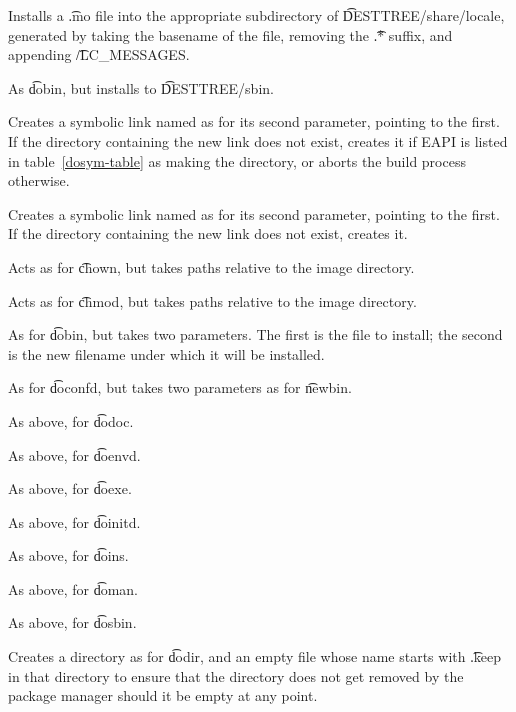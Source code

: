 \begin{description}
\item[domo] Installs a \t{.mo} file into the appropriate subdirectory of \t{DESTTREE/share/locale},
    generated by taking the basename of the file, removing the \t{.*} suffix, and appending
    \t{/LC\_MESSAGES}.

\item[dosbin] As \t{dobin}, but installs to \t{DESTTREE/sbin}.

\IFKDEBUILDELSE
{
    \item[dosym] Creates a symbolic link named as for its second parameter, pointing to the first. If
        the directory containing the new link does not exist, creates it if EAPI is listed in
        table~\ref{dosym-table} as making the directory, or aborts the build process otherwise.
}{
    \item[dosym] Creates a symbolic link named as for its second parameter, pointing to the first. If
        the directory containing the new link does not exist, creates it.
}

\item[fowners] Acts as for \t{chown}, but takes paths relative to the image directory.

\item[fperms] Acts as for \t{chmod}, but takes paths relative to the image directory.

\item[newbin] As for \t{dobin}, but takes two parameters. The first is the file to install; the
    second is the new filename under which it will be installed.

\item[newconfd] As for \t{doconfd}, but takes two parameters as for \t{newbin}.

\item[newdoc] As above, for \t{dodoc}.

\item[newenvd] As above, for \t{doenvd}.

\item[newexe] As above, for \t{doexe}.

\item[newinitd] As above, for \t{doinitd}.

\item[newins] As above, for \t{doins}.

\item[newman] As above, for \t{doman}.

\item[newsbin] As above, for \t{dosbin}.

\item[keepdir] Creates a directory as for \t{dodir}, and an empty file whose name starts with
    \t{.keep} in that directory to ensure that the directory does not get removed by the
    package manager should it be empty at any point.

\end{description}

